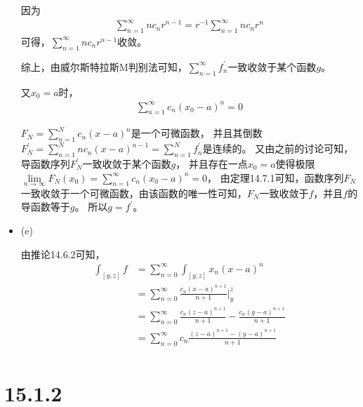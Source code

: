 \documentclass{article}
\begin{document}
\begin{itemize}
        因为
        \begin{align*}
          \sum\limits_{n = 1}^\infty nc_nr^{n - 1} = r^{-1} \sum\limits_{n = 1}^\infty nc_nr^{n}
        \end{align*}
        可得，$\sum\limits_{n = 1}^\infty nc_nr^{n - 1}$收敛。

        综上，由威尔斯特拉斯M判别法可知，$\sum \limits_{n = 1}^\infty f_n^\prime$一致收敛于某个函数$g$。

        又$x_0 = a$时，
        \begin{align*}
          \sum \limits_{n = 1}^\infty c_n(x_0 - a)^n = 0
        \end{align*}

        $F_N = \sum \limits_{n = 1}^N c_n(x - a)^n$是一个可微函数，
        并且其倒数$F_N^\prime = \sum \limits_{n = 1}^N nc_n(x - a)^{n - 1} = \sum \limits_{n = 1}^N f_n^\prime$是连续的。
        又由之前的讨论可知，导函数序列$F_N^\prime$一致收敛于某个函数$g$，
        并且存在一点$x_0 = a$使得极限$\lim\limits_{n \to \infty} F_N(x_0) = \sum \limits_{n = 1}^\infty c_n(x_0 - a)^n = 0$，
        由定理14.7.1可知，函数序列$F_N$一致收敛于一个可微函数，由该函数的唯一性可知，$F_N$一致收敛于$f$，并且$f$的导函数等于$g$。
        所以$g = f^\prime$。

  \item (e)

        由推论14.6.2可知，
        \begin{align*}
          \int_{[y, z]} f
           & = \sum\limits_{n = 0}^\infty \int_{[y, z]} x_n(x - a)^n                                          \\
           & = \sum\limits_{n = 0}^\infty \frac{c_n(x - a)^{n + 1}}{n + 1}|_y^z                               \\
           & = \sum\limits_{n = 0}^\infty \frac{c_n(z - a)^{n + 1}}{n + 1} - \frac{c_n(y - a)^{n + 1}}{n + 1} \\
           & = \sum\limits_{n = 0}^\infty c_n\frac{(z - a)^{n + 1} - (y - a)^{n + 1}}{n + 1}                  \\
        \end{align*}
\end{itemize}

\section*{15.1.2}
\end{document}
